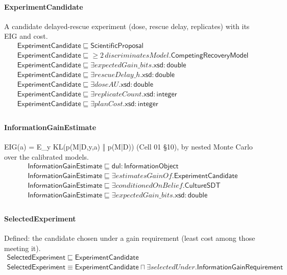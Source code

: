\documentclass[10pt]{article}
\begin{document}
\paragraph{ExperimentCandidate} A candidate delayed-rescue experiment (dose, rescue delay, replicates) with its EIG and cost.
\[\begin{array}{l}
\mathsf{ExperimentCandidate} \sqsubseteq  \mathsf{ScientificProposal} \\
\mathsf{ExperimentCandidate} \sqsubseteq  \geq 2\, \mathit{discriminatesModel}.\mathsf{CompetingRecoveryModel} \\
\mathsf{ExperimentCandidate} \sqsubseteq  \exists \mathit{expectedGain\_bits}.\mathsf{xsd{:}double} \\
\mathsf{ExperimentCandidate} \sqsubseteq  \exists \mathit{rescueDelay\_h}.\mathsf{xsd{:}double} \\
\mathsf{ExperimentCandidate} \sqsubseteq  \exists \mathit{doseAU}.\mathsf{xsd{:}double} \\
\mathsf{ExperimentCandidate} \sqsubseteq  \exists \mathit{replicateCount}.\mathsf{xsd{:}integer} \\
\mathsf{ExperimentCandidate} \sqsubseteq  \exists \mathit{planCost}.\mathsf{xsd{:}integer} \\
\end{array}\]
\paragraph{InformationGainEstimate} EIG(a) = E\_y KL(p(M|D,y,a) ‖ p(M|D)) (Cell 01 §10), by nested Monte Carlo over the calibrated models.
\[\begin{array}{l}
\mathsf{InformationGainEstimate} \sqsubseteq  \mathsf{dul{:}InformationObject} \\
\mathsf{InformationGainEstimate} \sqsubseteq  \exists \mathit{estimatesGainOf}.\mathsf{ExperimentCandidate} \\
\mathsf{InformationGainEstimate} \sqsubseteq  \exists \mathit{conditionedOnBelief}.\mathsf{CultureSDT} \\
\mathsf{InformationGainEstimate} \sqsubseteq  \exists \mathit{expectedGain\_bits}.\mathsf{xsd{:}double} \\
\end{array}\]
\paragraph{SelectedExperiment} Defined: the candidate chosen under a gain requirement (least cost among those meeting it).
\[\begin{array}{l}
\mathsf{SelectedExperiment} \sqsubseteq  \mathsf{ExperimentCandidate} \\
\mathsf{SelectedExperiment} \equiv  \mathsf{ExperimentCandidate} \sqcap  \exists \mathit{selectedUnder}.\mathsf{InformationGainRequirement} \\
\end{array}\]
\end{document}
